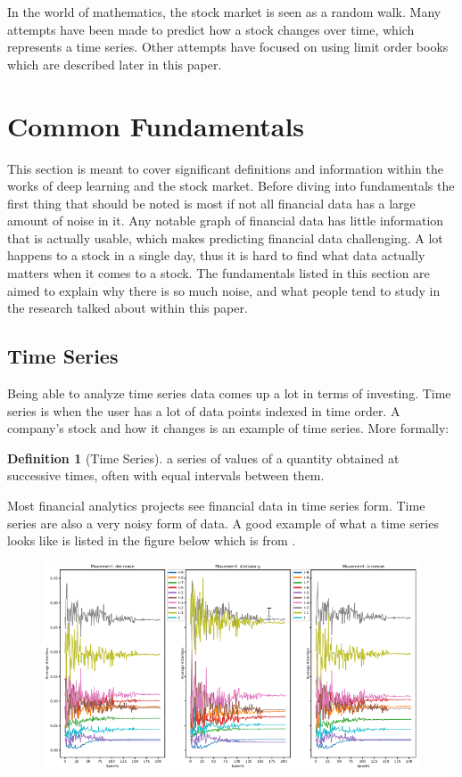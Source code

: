 \documentclass{article}
\theoremstyle{plain}
\theoremstyle{definition}
\newtheorem{definition}{Definition}
\numberwithin{equation}{section}
\numberwithin{theorem}{section}
\numberwithin{lemma}{section}
\numberwithin{definition}{section}
\numberwithin{proposition}{section}
\numberwithin{corollary}{section}
\begin{document}
	
	In the world of mathematics, the stock market is seen as a random walk. Many attempts have been made to predict how a stock changes over time, which represents a time series. Other attempts have focused on using limit order books which are described later in this paper. 
	
	\section{Common Fundamentals}
	This section is meant to cover significant definitions and information within the works of deep learning and the stock market. Before diving into fundamentals the first thing that should be noted is most if not all financial data has a large amount of noise in it. Any notable graph of financial data has little information that is actually usable, which makes predicting financial data challenging. A lot happens to a stock in a single day, thus it is hard to find what data actually matters when it comes to a stock. The fundamentals listed in this section are aimed to explain why there is so much noise, and what people tend to study in the research talked about within this paper.
	
	\subsection{Time Series}
	Being able to analyze time series data comes up a lot in terms of investing. Time series is when the user has a lot of data points indexed in time order. A company's stock and how it changes is an example of time series. More formally:
	\begin{definition}[Time Series]
		a series of values of a quantity obtained at successive times, often with equal intervals between them.
	\end{definition}
	
	
	Most financial analytics projects see financial data in time series form. Time series are also a very noisy form of data. A good example of what a time series looks like is listed in the figure below which is from \cite{Tran2017}.
	
	\begin{figure}[h]
		\includegraphics[width=\linewidth]{tseries}
	\end{figure}
	
\end{document}
